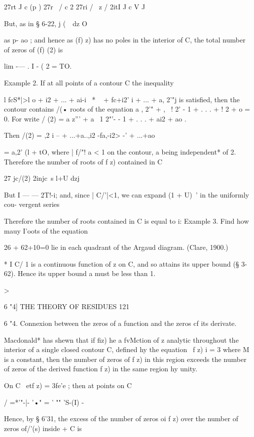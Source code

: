 27rt J c (p  ) 27r  \ / c 2 27ri /   \ z / 2itI J c V J 

But, as in § 6-22, j (\ \   dz O 

as p- ao ; and hence as (f) z) has no poles in the interior of C, the total number of 
zeros of (f) (2) is 

lim -— . I  - ( 2 = TO. 

Example 2. If at all points of a contour C the inequality 

l fcS*|>l o +  i2 + ... + ai-i~ * ~  +  fc+i2' i + ... + a, 2'"j 
is satisfied, then the contour contains /(• roots of the equation 
a , 2'" +  , \ ! 2'  - 1 + . . . +  ! 2 +  o = 0. 
For write / (2) = a z''' + a   \  1 2"'- - 1 + . . . + ai2 + ao . 

Then /(2) =  ,2 i   -- + ...+a..,i2  -fa,-i2> -' + ...+ao\ 

= a,2' (l + tO, 
where | f/"!  a < 1 on the contour, a being independent* of 2. 
Therefore the number of roots of f z) contained in C 

27 jc/(2) 2injc\ s l+U dzj 

But I — — 2T!-i; and, since | C/'|<1, we can expand (1 + U)~'  in the uniformly cou- 
  vergent series 

Therefore the number of roots contained in C is equal to i: 
Example 3. Find how mauy I'oots of the equation 

26 + 62+10=0 
lie in each quadrant of the Argaud diagram. (Clare, 1900.) 

* I C/ 1 is a continuous function of z on C, and so attains its upper bound (§ 3-62). Hence its 
upper bound a must be less than 1. 



> 



6 "4] THE THEORY OF RESIDUES 121 

6 "4. Connexion between the zeros of a function and the zeros cf its derivate. 

Macdonald* has shewn that if fiz) he a fvMction of z analytic throughout the interior of 
a single closed contour C, defined hy the equation \ f z) i = 3  where M is a constant, then the 
number of zeros of f z) in this region exceeds the number of zeros of the derived function 
f  z) in the same region hy unity. 

On C \ etf z) = 3fe'e ; then at points on C 

/  =*'"-|-  '•" = ' "" 'S-(I) - 

Hence, by § 6'31, the excess of the number of zeros oi f z) over the number of zeros 
of/'(s) inside + C is 

